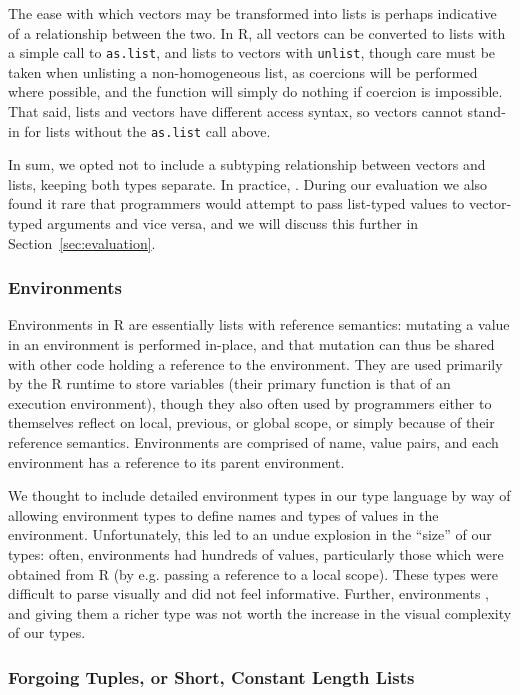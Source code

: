 \documentclass[acmsmall,review,anonymous]{acmart}\settopmatter{printfolios=true,printccs=false,printacmref=false}
\newcommand{\code}[1]{{\lstinline[style=Rin]!#1!}\xspace}
\begin{document}
The ease with which vectors may be transformed into lists is perhaps indicative of a relationship between the two.
In R, all vectors can be converted to lists with a simple call to \code{as.list}, and lists to vectors with \code{unlist}, though care must be taken when unlisting a non-homogeneous list, as coercions will be performed where possible, and the function will simply do nothing if coercion is impossible.
That said, lists and vectors have different access syntax, so vectors cannot stand-in for lists without the \code{as.list} call above.

In sum, we opted not to include a subtyping relationship between vectors and lists, keeping both types separate.
In practice, \AT{how often do \code{T[] | list<T>} types occur?}.
During our evaluation we also found it rare that programmers would attempt to pass list-typed values to vector-typed arguments and vice versa, and we will discuss this further in Section~\ref{sec:evaluation}.

%
%
\subsubsection{Environments}

Environments in R are essentially lists with reference semantics: mutating a value in an environment is performed in-place, and that mutation can thus be shared with other code holding a reference to the environment.
They are used primarily by the R runtime to store variables (their primary function is that of an execution environment), though they also often used by programmers either to themselves reflect on local, previous, or global scope, or simply because of their reference semantics.
Environments are comprised of name, value pairs, and each environment has a reference to its parent environment.

We thought to include detailed environment types in our type language by way of allowing environment types to define names and types of values in the environment.
Unfortunately, this led to an undue explosion in the ``size'' of our types: 
often, environments had hundreds of values, particularly those which were obtained from R (by e.g. passing a reference to a local scope).
These types were difficult to parse visually and did not feel informative.
Further, environments , and giving them a richer type was not worth the increase in the visual complexity of our types.

%
%
\subsubsection{Forgoing Tuples, or Short, Constant Length Lists}
\end{document}

